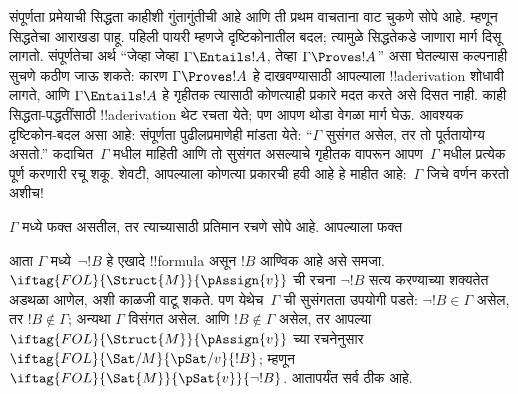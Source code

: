 \documentclass[../../../include/open-logic-section]{subfiles}
\begin{document}
      {}
      {}


संपूर्णता प्रमेयाची सिद्धता काहीशी गुंतागुंतीची आहे आणि ती प्रथम वाचताना
वाट चुकणे सोपे आहे. म्हणून सिद्धतेचा आराखडा पाहू. पहिली पायरी म्हणजे
दृष्टिकोनातील बदल; त्यामुळे सिद्धतेकडे जाणारा मार्ग दिसू लागतो. संपूर्णतेचा
अर्थ “जेव्हा जेव्हा $\Gamma \Entails !A$, तेव्हा $\Gamma \Proves !A$”
असा घेतल्यास कल्पनाही सुचणे कठीण जाऊ शकते: कारण $\Gamma \Proves !A$ हे
दाखवण्यासाठी आपल्याला !!a{derivation} शोधावी लागते, आणि $\Gamma \Entails
!A$ हे गृहीतक त्यासाठी कोणत्याही प्रकारे मदत करते असे दिसत नाही. काही
सिद्धता-पद्धतींसाठी !!a{derivation} थेट रचता येते; पण आपण थोडा वेगळा मार्ग
घेऊ. आवश्यक दृष्टिकोन-बदल असा आहे: संपूर्णता पुढीलप्रमाणेही मांडता येते:
“$\Gamma$ सुसंगत असेल, तर तो पूर्ततायोग्य असतो.” कदाचित~$\Gamma$ मधील
माहिती आणि तो सुसंगत असल्याचे गृहीतक वापरून आपण~$\Gamma$ मधील प्रत्येक
 पूर्ण करणारी
 रचू शकू. शेवटी, आपल्याला
कोणत्या प्रकारची  हवी आहे हे
माहीत आहे:~$\Gamma$ जिचे वर्णन करतो अशीच!{}

$\Gamma$ मध्ये फक्त  असतील, तर त्याच्यासाठी
प्रतिमान रचणे सोपे आहे. आपल्याला फक्त

आता $\Gamma$ मध्ये~$\lnot !B$ हे एखादे !!{formula} असून $!B$ आण्विक आहे
असे समजा. $\iftag{FOL}{\Struct{M}}{\pAssign{v}}$ ची रचना $\lnot !B$ सत्य
करण्याच्या शक्यतेत अडथळा आणेल, अशी काळजी वाटू शकते. पण येथेच~$\Gamma$ ची
सुसंगतता उपयोगी पडते: $\lnot !B \in \Gamma$ असेल, तर $!B \notin \Gamma$;
अन्यथा $\Gamma$ विसंगत असेल. आणि $!B \notin \Gamma$ असेल, तर आपल्या
$\iftag{FOL}{\Struct{M}}{\pAssign{v}}$ च्या रचनेनुसार
$\iftag{FOL}{\Sat/{M}}{\pSat/{v}}{!B}$; म्हणून
$\iftag{FOL}{\Sat{M}}{\pSat{v}}{\lnot !B}$. आतापर्यंत सर्व ठीक आहे.
\end{document}
